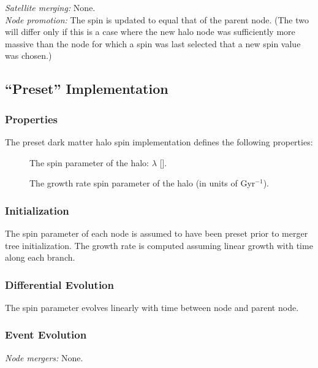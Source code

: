 \noindent\emph{Satellite merging:} None.\\

\noindent\emph{Node promotion:} The spin is updated to equal that of the parent node. (The two will differ only if this is a case where the new halo \gls{node} was sufficiently more massive than the \gls{node} for which a spin was last selected that a new spin value was chosen.)\\

\subsection{``Preset'' Implementation}

\subsubsection{Properties}

The preset dark matter halo spin implementation defines the following properties:
\begin{description}
 \item [] The spin parameter of the halo: $\lambda$ [].
 \item [] The growth rate spin parameter of the halo (in units of Gyr$^{-1}$).
\end{description}

\subsubsection{Initialization}

The spin parameter of each \gls{node} is assumed to have been preset prior to merger tree initialization. The growth rate is computed assuming linear growth with time along each branch.

\subsubsection{Differential Evolution}

The spin parameter evolves linearly with time between \gls{node} and parent node.

\subsubsection{Event Evolution}

\noindent\emph{Node mergers:} None.\\

